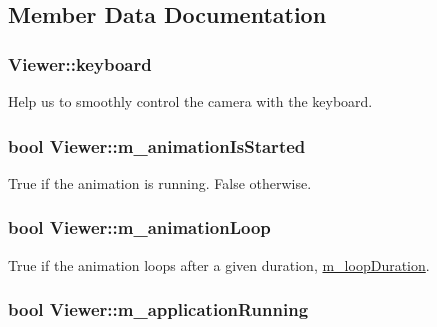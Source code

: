 \subsection{Member Data Documentation}
\hypertarget{classViewer_a0c8e2d656c33435015ce34b06e047e77}{
\subsubsection[{keyboard}]{ Viewer\+::keyboard\hspace{0.3cm}{\ttfamily [private]}}}\label{classViewer_a0c8e2d656c33435015ce34b06e047e77}
Help us to smoothly control the camera with the keyboard. \hypertarget{classViewer_af77f428d66cb515b77774efd36846ce2}{
\subsubsection[{m\+\_\+animation\+Is\+Started}]{\setlength{\rightskip}{0pt plus 5cm}bool Viewer\+::m\+\_\+animation\+Is\+Started\hspace{0.3cm}{\ttfamily [private]}}}\label{classViewer_af77f428d66cb515b77774efd36846ce2}
True if the animation is running. False otherwise. \hypertarget{classViewer_a8333976239ee77a66bad2975600ec880}{
\subsubsection[{m\+\_\+animation\+Loop}]{\setlength{\rightskip}{0pt plus 5cm}bool Viewer\+::m\+\_\+animation\+Loop\hspace{0.3cm}{\ttfamily [private]}}}\label{classViewer_a8333976239ee77a66bad2975600ec880}
True if the animation loops after a given duration, \hyperlink{classViewer_a361b307d72d4647b895b0c35d6b3a3a9}{m\+\_\+loop\+Duration}. \hypertarget{classViewer_a3172d624cfacccdbc5cc225535429880}{
\subsubsection[{m\+\_\+application\+Running}]{\setlength{\rightskip}{0pt plus 5cm}bool Viewer\+::m\+\_\+application\+Running\hspace{0.3cm}{\ttfamily [private]}}}\label{classViewer_a3172d624cfacccdbc5cc225535429880}
